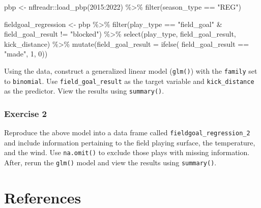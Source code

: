 \documentclass[
  letterpaper,
]{krantz}
\newenvironment{Shaded}{\begin{snugshade}}{\end{snugshade}}
\newcommand{\AttributeTok}[1]{\textcolor[rgb]{0.40,0.45,0.13}{#1}}
\newcommand{\DecValTok}[1]{\textcolor[rgb]{0.68,0.00,0.00}{#1}}
\newcommand{\FunctionTok}[1]{\textcolor[rgb]{0.28,0.35,0.67}{#1}}
\newcommand{\NormalTok}[1]{\textcolor[rgb]{0.00,0.23,0.31}{#1}}
\newcommand{\OtherTok}[1]{\textcolor[rgb]{0.00,0.23,0.31}{#1}}
\newcommand{\SpecialCharTok}[1]{\textcolor[rgb]{0.37,0.37,0.37}{#1}}
\newcommand{\StringTok}[1]{\textcolor[rgb]{0.13,0.47,0.30}{#1}}
\begin{document}
\begin{Shaded}
\begin{Highlighting}[]
\NormalTok{pbp }\OtherTok{\textless{}{-}}\NormalTok{ nflreadr}\SpecialCharTok{::}\FunctionTok{load\_pbp}\NormalTok{(}\DecValTok{2015}\SpecialCharTok{:}\DecValTok{2022}\NormalTok{) }\SpecialCharTok{\%\textgreater{}\%}
  \FunctionTok{filter}\NormalTok{(season\_type }\SpecialCharTok{==} \StringTok{"REG"}\NormalTok{)}

\NormalTok{fieldgoal\_regression }\OtherTok{\textless{}{-}}\NormalTok{ pbp }\SpecialCharTok{\%\textgreater{}\%}
  \FunctionTok{filter}\NormalTok{(play\_type }\SpecialCharTok{==} \StringTok{"field\_goal"} \SpecialCharTok{\&}\NormalTok{ field\_goal\_result }\SpecialCharTok{!=} \StringTok{"blocked"}\NormalTok{) }\SpecialCharTok{\%\textgreater{}\%}
  \FunctionTok{select}\NormalTok{(play\_type, field\_goal\_result, kick\_distance) }\SpecialCharTok{\%\textgreater{}\%}
  \FunctionTok{mutate}\NormalTok{(}\AttributeTok{field\_goal\_result =} \FunctionTok{ifelse}\NormalTok{(}
\NormalTok{    field\_goal\_result }\SpecialCharTok{==} \StringTok{"made"}\NormalTok{, }\DecValTok{1}\NormalTok{, }\DecValTok{0}\NormalTok{))}
\end{Highlighting}
\end{Shaded}

Using the data, construct a generalized linear model (\texttt{glm()})
with the \texttt{family} set to \texttt{binomial}. Use
\texttt{field\_goal\_result} as the target variable and
\texttt{kick\_distance} as the predictor. View the results using
\texttt{summary()}.

\hypertarget{exercise-2-3}{%
\subsection{Exercise 2}\label{exercise-2-3}}

Reproduce the above model into a data frame called
\texttt{fieldgoal\_regression\_2} and include information pertaining to
the field playing surface, the temperature, and the wind. Use
\texttt{na.omit()} to exclude those plays with missing information.
After, rerun the \texttt{glm()} model and view the results using
\texttt{summary()}.


\hypertarget{references}{%
\chapter*{References}\label{references}}
\end{document}
